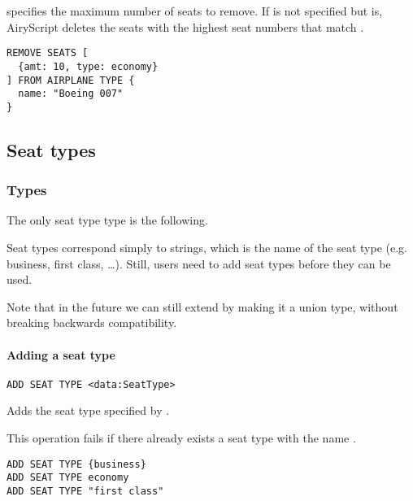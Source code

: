  specifies the maximum number of seats to remove. If  is
not specified but  is, AiryScript deletes the seats with the highest
seat numbers that match .

\begin{texa}
  {
  \begin{lstlisting}
REMOVE SEATS [
  {amt: 10, type: economy}
] FROM AIRPLANE TYPE {
  name: "Boeing 007"
}
\end{lstlisting}
  }
\end{texa}

\subsection{Seat types}

\subsubsection{Types}
The only seat type type is the following.
\begin{description}
  \item[] 
\end{description}
Seat types correspond simply to strings, which is the name of the seat type
(e.g. business, first class, …). Still, users need to add seat types before
they can be used.

Note that in the future we can still extend  by making it a union
type, without breaking backwards compatibility.

\paragraph{Adding a seat type}
\begin{operation}
  \lstinline{ADD SEAT TYPE <data:SeatType>}
\end{operation}
Adds the seat type specified by .

This operation fails if there already exists a seat type with the name
.

\begin{texa}
  \begin{lstlisting}
ADD SEAT TYPE {business}
ADD SEAT TYPE economy
ADD SEAT TYPE "first class"
  \end{lstlisting}
\end{texa}

